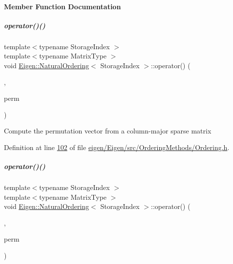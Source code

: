 \paragraph{Member Function Documentation}
\mbox{\label{group___ordering_methods___module_aa39e772105ed66da9e909f2a9385be37}} 
\subparagraph{\texorpdfstring{operator()()}{operator()()}\hspace{0.1cm}{\footnotesize\ttfamily [1/2]}}
{\footnotesize\ttfamily template$<$typename Storage\+Index $>$ \\
template$<$typename Matrix\+Type $>$ \\
void \hyperlink{group___ordering_methods___module_class_eigen_1_1_natural_ordering}{Eigen\+::\+Natural\+Ordering}$<$ Storage\+Index $>$\+::operator() (\begin{DoxyParamCaption}\item[{const Matrix\+Type \&}]{,  }\item[{\hyperlink{group___core___module}{Permutation\+Type} \&}]{perm }\end{DoxyParamCaption})\hspace{0.3cm}{\ttfamily [inline]}}

Compute the permutation vector from a column-\/major sparse matrix 

Definition at line \hyperlink{eigen_2_eigen_2src_2_ordering_methods_2_ordering_8h_source_l00102}{102} of file \hyperlink{eigen_2_eigen_2src_2_ordering_methods_2_ordering_8h_source}{eigen/\+Eigen/src/\+Ordering\+Methods/\+Ordering.\+h}.

\mbox{\label{group___ordering_methods___module_aa39e772105ed66da9e909f2a9385be37}} 
\subparagraph{\texorpdfstring{operator()()}{operator()()}\hspace{0.1cm}{\footnotesize\ttfamily [2/2]}}
{\footnotesize\ttfamily template$<$typename Storage\+Index $>$ \\
template$<$typename Matrix\+Type $>$ \\
void \hyperlink{group___ordering_methods___module_class_eigen_1_1_natural_ordering}{Eigen\+::\+Natural\+Ordering}$<$ Storage\+Index $>$\+::operator() (\begin{DoxyParamCaption}\item[{const Matrix\+Type \&}]{,  }\item[{\hyperlink{group___core___module}{Permutation\+Type} \&}]{perm }\end{DoxyParamCaption})\hspace{0.3cm}{\ttfamily [inline]}}

